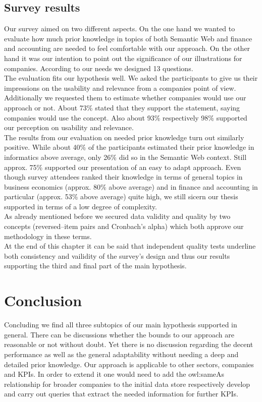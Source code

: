 \documentclass[runningheads]{llncs}
\begin{document}
\subsection{Survey results}
Our survey aimed on two different aspects. On the one hand we wanted to evaluate how much prior knowledge in topics of both Semantic Web and finance and accounting are needed to feel comfortable with our approach. On the other hand it was our intention to point out the significance of our illustrations for companies. According to our needs we designed 13 questions.\\
The evaluation fits our hypothesis well. We asked the participants to give us their impressions on the usability and relevance from a companies point of view. Additionally we requested them to estimate whether companies would use our approach or not. About 73\% stated that they support the statement, saying companies would use the concept. Also about 93\% respectively 98\% supported our perception on usability and relevance.\\
The results from our evaluation on needed prior knowledge turn out similarly positive. While about 40\% of the participants estimated their prior knowledge in informatics above average, only 26\% did so in the Semantic Web context. Still approx. 75\% supported our presentation of an easy to adapt approach. Even though survey attendees ranked their knowledge in terms of general topics in business economics (approx. 80\% above average) and in finance and accounting in particular (approx. 53\% above average) quite high, we still sicern our thesis supported in terms of a low degree of complexity. \\
As already mentioned before we secured data validity and quality by two concepts (reversed--item pairs and Cronbach's alpha) which both approve our methodology in these terms.\\ 
At the end of this chapter it can be said that independent quality tests underline both consistency and vailidity of the survey's design and thus our results supporting the third and final part of the main hypothesis.
\section{Conclusion}
Concluding we find all three subtopics of our main hypothesis supported in general. There can be discussions whether the bounds to our approach are reasonable or not without doubt. Yet there is no discussion regarding the decent performance as well as the general adaptability without needing a deep and detailed prior knowledge. Our approach is applicable to other sectors, companies and KPIs. In order to extend it one would need to add the owl:sameAs relationship for broader companies to the initial data store respectively develop and carry out queries that extract the needed information for further KPIs.
%


\end{document}
